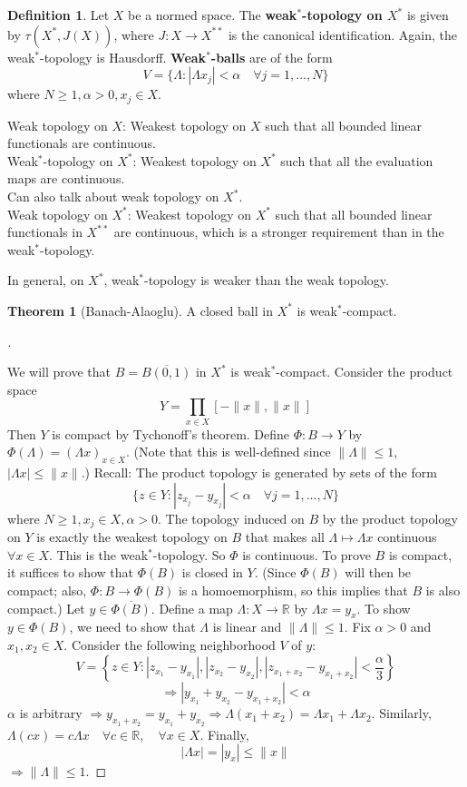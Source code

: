 \documentclass{article}
\theoremstyle{definition}
\newtheorem{thm}{Theorem}
\newtheorem{dfn}{Definition}
\newenvironment{proofs}[1][\proofname]{%
  \begin{proof}[#1]$ $\par\nobreak\ignorespaces
}{%
  \end{proof}
}
\newcommand{\RR}{\mathbb R}
\newcommand{\Ra}{\Rightarrow}
\begin{document}
\begin{dfn}
	Let $X$ be a normed space.
	The \textbf{weak$^{\bm{*}}$-topology on $X^*$} is given by $\tau(X^*, J(X))$, where $J: X \to X^{**}$ is the canonical identification.
	Again, the weak$^*$-topology is Hausdorff.
	\textbf{Weak$^{\bm{*}}$-balls} are of the form
	\[
		V = \{\Lambda: |\Lambda x_j| < \alpha \quad \forall j = 1, ..., N\}
	\]
	where $N \geq 1, \alpha > 0, x_j \in X$.
\end{dfn}

\noindent Weak topology on $X$: Weakest topology on $X$ such that all bounded linear functionals are continuous.\\
Weak$^*$-topology on $X^*$: Weakest topology on $X^*$ such that all the evaluation maps are continuous.\\
Can also talk about weak topology on $X^*$.\\
Weak topology on $X^*$: Weakest topology on $X^*$ such that all bounded linear functionals in $X^{**}$ are continuous, which is a stronger requirement than in the weak$^*$-topology.

\par In general, on $X^*$, weak$^*$-topology is weaker than the weak topology.

\begin{thm}[Banach-Alaoglu]
	A closed ball in $X^*$ is weak$^*$-compact.
\end{thm}

\begin{proofs}
	We will prove that $B = \overline{B(0, 1)}$ in $X^*$ is weak$^*$-compact.
	Consider the product space
	\[
		Y = \prod_{x \in X} [-\|x\|, \|x\|]
	\]
	Then $Y$ is compact by Tychonoff's theorem.
	Define $\Phi: B \to Y$ by $\Phi(\Lambda) = (\Lambda x)_{x \in X}$.
	(Note that this is well-defined since $\|\Lambda\| \leq 1$, $|\Lambda x| \leq \|x\|$.)
	Recall: The product topology is generated by sets of the form
	\[
		\{z \in Y: |z_{x_j} - y_{x_j}| < \alpha \quad \forall j = 1, ..., N\}
	\]
	where $N \geq 1, x_j \in X, \alpha > 0$.
	The topology induced on $B$ by the product topology on $Y$ is exactly the weakest topology on $B$ that makes all $\Lambda \mapsto \Lambda x$ continuous $\forall x \in X$.
	This is the weak$^*$-topology.
	So $\Phi$ is continuous.
	To prove $B$ is compact, it suffices to show that $\Phi(B)$ is closed in $Y$.
	(Since $\Phi(B)$ will then be compact; 
	also, $\Phi: B \to \Phi(B)$ is a homoemorphism, so this implies that $B$ is also compact.)
	Let $y \in \overline{\Phi(B)}$.
	Define a map $\Lambda: X \to \RR$ by $\Lambda x = y_x$.
	To show $y \in \Phi(B)$, we need to show that $\Lambda$ is linear and $\|\Lambda\| \leq 1$.
	Fix $\alpha > 0$ and $x_1, x_2 \in X$.
	Consider the following neighborhood $V$ of $y$:
	\[
		V = \left\{z \in Y: |z_{x_1} - y_{x_1}|, |z_{x_2} - y_{x_2}|, |z_{x_1 + x_2} - y_{x_1 + x_2}| < \frac{\alpha}{3} \right\}
	\]
	\[
		\Ra |y_{x_1} + y_{x_2} - y_{x_1 + x_2}| < \alpha
	\]
	$\alpha$ is arbitrary $\Ra y_{x_1 + x_2} = y_{x_1} + y_{x_2} \Ra \Lambda (x_1 + x_2) = \Lambda x_1 + \Lambda x_2$.
	Similarly, $\Lambda (cx) = c \Lambda x \quad \forall c \in \RR, \quad \forall x \in X$.
	Finally, 
	\[
		|\Lambda x| = |y_x| \leq \|x\|
	\]
	$\Ra \|\Lambda\| \leq 1$.
\end{proofs}
\end{document}
